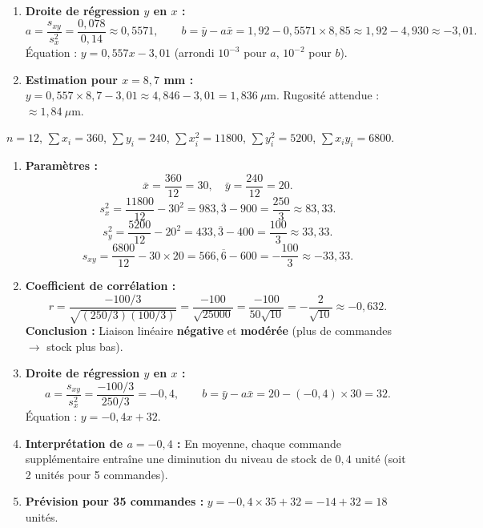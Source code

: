 \documentclass[11pt]{article}
\begin{document}
\begin{corrige}
\begin{enumerate}
\item \textbf{Droite de régression $y$ en $x$ :}
\[
a = \frac{s_{xy}}{s_x^2} = \frac{0,078}{0,14} \approx 0,5571, \qquad
b = \bar{y} - a\bar{x} = 1,92 - 0,5571 \times 8,85 \approx 1,92 - 4,930 \approx -3,01.
\]
Équation : $\boxed{y = 0,557x - 3,01}$ (arrondi $10^{-3}$ pour $a$, $10^{-2}$ pour $b$).

\item \textbf{Estimation pour $x = 8,7$ mm :}
$y = 0,557 \times 8,7 - 3,01 \approx 4,846 - 3,01 = 1,836 \ \mu\text{m}$.
Rugosité attendue : $\approx 1,84 \ \mu\text{m}$.
\end{enumerate}
\end{corrige}

\begin{corrige}
$n=12$, $\sum x_i=360$, $\sum y_i=240$, $\sum x_i^2=11800$, $\sum y_i^2=5200$, $\sum x_i y_i=6800$.

\begin{enumerate}
\item \textbf{Paramètres :}
\[
\bar{x} = \frac{360}{12} = 30, \quad \bar{y} = \frac{240}{12} = 20.
\]
\[
s_x^2 = \frac{11800}{12} - 30^2 = 983,\overline{3} - 900 = \frac{250}{3} \approx 83,33.
\]
\[
s_y^2 = \frac{5200}{12} - 20^2 = 433,\overline{3} - 400 = \frac{100}{3} \approx 33,33.
\]
\[
s_{xy} = \frac{6800}{12} - 30 \times 20 = 566,\overline{6} - 600 = -\frac{100}{3} \approx -33,33.
\]

\item \textbf{Coefficient de corrélation :}
\[
r = \frac{-100/3}{\sqrt{(250/3)(100/3)}} = \frac{-100}{\sqrt{25000}} = \frac{-100}{50\sqrt{10}} = -\frac{2}{\sqrt{10}} \approx -0,632.
\]
\textbf{Conclusion :} Liaison linéaire \textbf{négative} et \textbf{modérée} (plus de commandes $\rightarrow$ stock plus bas).

\item \textbf{Droite de régression $y$ en $x$ :}
\[
a = \frac{s_{xy}}{s_x^2} = \frac{-100/3}{250/3} = -0,4, \qquad
b = \bar{y} - a\bar{x} = 20 - (-0,4)\times 30 = 32.
\]
Équation : $\boxed{y = -0,4x + 32}$.

\item \textbf{Interprétation de $a = -0,4$ :} En moyenne, chaque commande supplémentaire entraîne une diminution du niveau de stock de $0,4$ unité (soit 2 unités pour 5 commandes).

\item \textbf{Prévision pour 35 commandes :} $y = -0,4 \times 35 + 32 = -14 + 32 = 18$ unités.
\end{enumerate}
\end{corrige}
\end{document}
